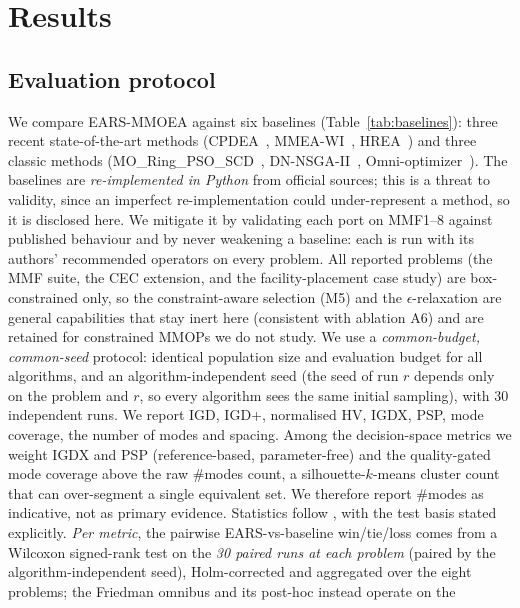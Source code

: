 \section{Results}
\label{sec:experiments}

\subsection{Evaluation protocol}
\label{sec:protocol}
We compare EARS-MMOEA against six baselines (Table~\ref{tab:baselines}): three recent
state-of-the-art methods (CPDEA~\parencite{liu2020cpdea}, MMEA-WI~\parencite{li2021mmeawi},
HREA~\parencite{li2023hrea}) and three classic methods
(MO\_Ring\_PSO\_SCD~\parencite{yue2018moring}, DN-NSGA-II~\parencite{liang2016dnnsga2},
Omni-optimizer~\parencite{deb2008omni}). The baselines are \emph{re-implemented in Python} from
official sources; this is a threat to validity, since an imperfect re-implementation could
under-represent a method, so it is disclosed here. We mitigate it by
validating each port on MMF1--8 against published behaviour and by never weakening a
baseline: each is run with its authors' recommended operators on every problem. All reported
problems (the MMF suite, the CEC extension, and the facility-placement case study) are
box-constrained only, so the constraint-aware selection (M5) and the $\epsilon$-relaxation are
general capabilities that stay inert here (consistent with ablation A6) and are retained for
constrained MMOPs we do not study. We use a \emph{common-budget, common-seed} protocol: identical
population size and evaluation budget for all algorithms, and an algorithm-independent
seed (the seed of run $r$ depends only on the problem and $r$, so every algorithm sees the
same initial sampling), with 30 independent runs. We report IGD, IGD+, normalised HV,
IGDX, PSP, mode coverage, the number of modes and spacing. Among the decision-space metrics we
weight IGDX and PSP (reference-based, parameter-free) and the quality-gated mode coverage above
the raw $\#$modes count, a silhouette-$k$-means cluster count that can over-segment a single
equivalent set. We therefore report $\#$modes as indicative, not as primary evidence.
Statistics follow
\textcite{demsar2006statistical}, with the test basis stated explicitly. \emph{Per metric},
the pairwise EARS-vs-baseline win/tie/loss comes from a Wilcoxon signed-rank test on the \emph{30
paired runs at each problem} (paired by the algorithm-independent seed), Holm-corrected and
aggregated over the eight problems; the Friedman omnibus and its post-hoc instead operate on the
